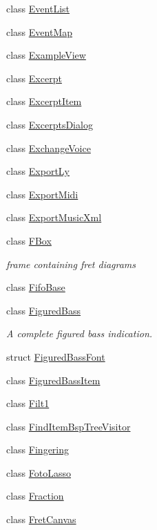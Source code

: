 \begin{DoxyCompactItemize}
\item 
class \hyperlink{class_ms_1_1_event_list}{Event\+List}
\item 
class \hyperlink{class_ms_1_1_event_map}{Event\+Map}
\item 
class \hyperlink{class_ms_1_1_example_view}{Example\+View}
\item 
class \hyperlink{class_ms_1_1_excerpt}{Excerpt}
\item 
class \hyperlink{class_ms_1_1_excerpt_item}{Excerpt\+Item}
\item 
class \hyperlink{class_ms_1_1_excerpts_dialog}{Excerpts\+Dialog}
\item 
class \hyperlink{class_ms_1_1_exchange_voice}{Exchange\+Voice}
\item 
class \hyperlink{class_ms_1_1_export_ly}{Export\+Ly}
\item 
class \hyperlink{class_ms_1_1_export_midi}{Export\+Midi}
\item 
class \hyperlink{class_ms_1_1_export_music_xml}{Export\+Music\+Xml}
\item 
class \hyperlink{class_ms_1_1_f_box}{F\+Box}
\begin{DoxyCompactList}\small\item\em frame containing fret diagrams \end{DoxyCompactList}\item 
class \hyperlink{class_ms_1_1_fifo_base}{Fifo\+Base}
\item 
class \hyperlink{class_ms_1_1_figured_bass}{Figured\+Bass}
\begin{DoxyCompactList}\small\item\em A complete figured bass indication. \end{DoxyCompactList}\item 
struct \hyperlink{struct_ms_1_1_figured_bass_font}{Figured\+Bass\+Font}
\item 
class \hyperlink{class_ms_1_1_figured_bass_item}{Figured\+Bass\+Item}
\item 
class \hyperlink{class_ms_1_1_filt1}{Filt1}
\item 
class \hyperlink{class_ms_1_1_find_item_bsp_tree_visitor}{Find\+Item\+Bsp\+Tree\+Visitor}
\item 
class \hyperlink{class_ms_1_1_fingering}{Fingering}
\item 
class \hyperlink{class_ms_1_1_foto_lasso}{Foto\+Lasso}
\item 
class \hyperlink{class_ms_1_1_fraction}{Fraction}
\item 
class \hyperlink{class_ms_1_1_fret_canvas}{Fret\+Canvas}

\end{DoxyCompactItemize}

